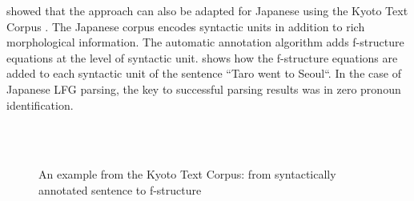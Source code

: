 \documentclass[output=paper,hidelinks]{langscibook}
\begin{document}
\citet{oya-genabith-2007-automatic} showed that the approach can also be adapted for Japanese using the Kyoto Text Corpus \citep{Kurohashi-Nagao-1997}. The Japanese corpus encodes syntactic units in addition to rich morphological information. The automatic annotation algorithm adds f-structure equations at the level of syntactic unit.  shows how the f-structure equations are added to each syntactic unit of the sentence ``Taro went to Seoul``. In the case of Japanese LFG parsing, the key to successful parsing results was in zero pronoun identification.

\begin{figure}[htb]
\small
    \\[1ex]
    \\
    \caption{An example from the Kyoto Text Corpus: from syntactically annotated sentence to f-structure}
    \label{fig:japanese}
\end{figure}
\end{document}
